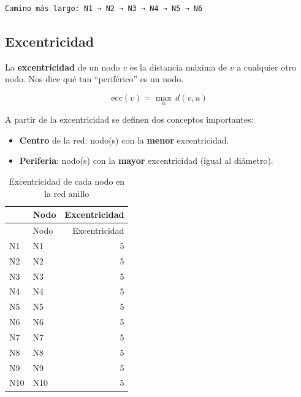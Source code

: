 \documentclass[
  letterpaper,
  DIV=11,
  numbers=noendperiod]{scrreprt}
\newenvironment{Shaded}{\begin{snugshade}}{\end{snugshade}}
\newcommand{\AttributeTok}[1]{\textcolor[rgb]{0.40,0.45,0.13}{#1}}
\newcommand{\CommentTok}[1]{\textcolor[rgb]{0.37,0.37,0.37}{#1}}
\newcommand{\FunctionTok}[1]{\textcolor[rgb]{0.28,0.35,0.67}{#1}}
\newcommand{\NormalTok}[1]{\textcolor[rgb]{0.00,0.23,0.31}{#1}}
\newcommand{\OtherTok}[1]{\textcolor[rgb]{0.00,0.23,0.31}{#1}}
\newcommand{\SpecialCharTok}[1]{\textcolor[rgb]{0.37,0.37,0.37}{#1}}
\newcommand{\StringTok}[1]{\textcolor[rgb]{0.13,0.47,0.30}{#1}}
\providecommand{\tightlist}{%
  \setlength{\itemsep}{0pt}\setlength{\parskip}{0pt}}
\begin{document}
\begin{verbatim}
Camino más largo: N1 → N2 → N3 → N4 → N5 → N6 
\end{verbatim}

\subsection{Excentricidad}\label{excentricidad}

La \textbf{excentricidad} de un nodo \(v\) es la distancia máxima de
\(v\) a cualquier otro nodo. Nos dice qué tan ``periférico'' es un nodo.

\[
\text{ecc}(v) = \max_{u} \, d(v, u)
\]

A partir de la excentricidad se definen dos conceptos importantes:

\begin{itemize}
\tightlist
\item
  \textbf{Centro} de la red: nodo(s) con la \textbf{menor}
  excentricidad.
\item
  \textbf{Periferia}: nodo(s) con la \textbf{mayor} excentricidad (igual
  al diámetro).
\end{itemize}

\begin{Shaded}
\end{Shaded}

\begin{longtable}[]{@{}llr@{}}
\caption{Excentricidad de cada nodo en la red anillo}\tabularnewline
\toprule\noalign{}
& Nodo & Excentricidad \\
\midrule\noalign{}
\endfirsthead
\toprule\noalign{}
& Nodo & Excentricidad \\
\midrule\noalign{}
\endhead
\bottomrule\noalign{}
\endlastfoot
N1 & N1 & 5 \\
N2 & N2 & 5 \\
N3 & N3 & 5 \\
N4 & N4 & 5 \\
N5 & N5 & 5 \\
N6 & N6 & 5 \\
N7 & N7 & 5 \\
N8 & N8 & 5 \\
N9 & N9 & 5 \\
N10 & N10 & 5 \\
\end{longtable}
\end{document}
